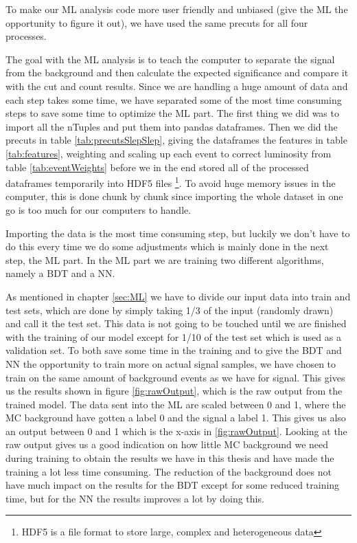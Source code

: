 \restoregeometry

To make our ML analysis code more user friendly and unbiased (give the ML the opportunity to figure it out), we have used the same precuts for all four processes.

The goal with the ML analysis is to teach the computer to separate the signal from the background and then calculate the expected significance and compare it with the cut and count results. Since we are handling a huge amount of data and each step takes some time, we have separated some of the most time consuming steps to save some time to optimize the ML part. The first thing we did was to import all the nTuples and put them into pandas dataframes. Then we did the precuts in table \ref{tab:precutsSlepSlep}, giving the dataframes the features in table \ref{tab:features}, weighting and scaling up each event to correct luminosity from table \ref{tab:eventWeights} before we in the end stored all of the processed dataframes temporarily into HDF5 files \footnote{HDF5 \cite{hdf5} is a file format to store large, complex and heterogeneous data}. To avoid huge memory issues in the computer, this is done chunk by chunk since importing the whole dataset in one go is too much for our computers to handle. 

Importing the data is the most time consuming step, but luckily we don't have to do this every time we do some adjustments which is mainly done in the next step, the ML part. In the ML part we are training two different algorithms, namely a BDT and a NN. 

As mentioned in chapter \ref{sec:ML} we have to divide our input data into train and test sets, which are done by simply taking 1/3 of the input (randomly drawn) and call it the test set. This data is not going to be touched until we are finished with the training of our model except for 1/10 of the test set which is used as a validation set. To both save some time in the training and to give the BDT and NN the opportunity to train more on actual signal samples, we have chosen to train on the same amount of background events as we have for signal. This gives us the results shown in figure \ref{fig:rawOutput}, which is the raw output from the trained model. The data sent into the ML are scaled between 0 and 1, where the MC background have gotten a label 0 and the signal a label 1. This gives us also an output between 0 and 1 which is the x-axis in \ref{fig:rawOutput}. Looking at the raw output gives us a good indication on how little MC background we need during training to obtain the results we have in this thesis and have made the training a lot less time consuming. The reduction of the background does not have much impact on the results for the BDT except for some reduced training time, but for the NN the results improves a lot by doing this. 



